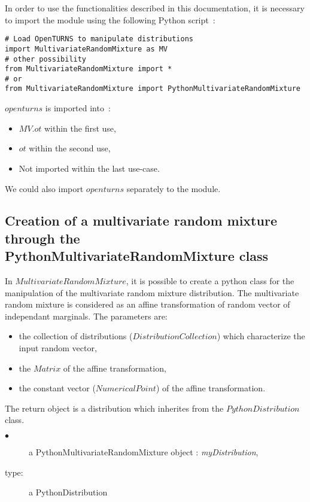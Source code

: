 In order to use the functionalities described in this documentation, it is necessary to import the module 
using the following Python script~:

\begin{lstlisting}
# Load OpenTURNS to manipulate distributions
import MultivariateRandomMixture as MV
# other possibility
from MultivariateRandomMixture import *
# or
from MultivariateRandomMixture import PythonMultivariateRandomMixture
\end{lstlisting}
$openturns$ is imported into~: 
\begin{itemize}
   \item $MV.ot$ within the first use,
   \item $ot$ within the second use,
   \item Not imported within the last use-case.
\end{itemize}

We could also import $openturns$ separately to the module.


\subsection{Creation of a multivariate random mixture through the PythonMultivariateRandomMixture class} \label{MVRM}

In $MultivariateRandomMixture$, it is possible to create a python class for the manipulation of the multivariate random mixture distribution.
The multivariate random mixture is considered as an affine transformation of random vector of independant marginals. 
The parameters are:
\begin{itemize}
 \item the collection of distributions ($DistributionCollection$) which characterize the input random vector,
 \item the $Matrix$ of the affine transformation, 
 \item the constant vector ($NumericalPoint$) of the affine transformation.
\end{itemize}

The return object is a distribution which inherites from the $PythonDistribution$ class.\\
{
  \begin{description}
  \item[$\bullet$] a PythonMultivariateRandomMixture object : {\itshape myDistribution},
  \item[type:] a PythonDistribution
  \end{description}
}
\espace

